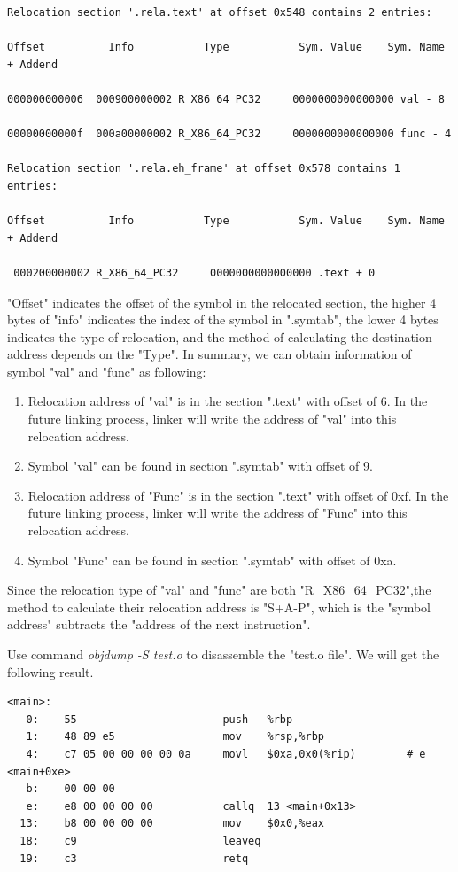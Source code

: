         \begin{lstlisting}[caption=Relocation section of "test.o"]
Relocation section '.rela.text' at offset 0x548 contains 2 entries: 

Offset          Info           Type           Sym. Value    Sym. Name + Addend 

000000000006  000900000002 R_X86_64_PC32     0000000000000000 val - 8 

00000000000f  000a00000002 R_X86_64_PC32     0000000000000000 func - 4 

Relocation section '.rela.eh_frame' at offset 0x578 contains 1 entries: 

Offset          Info           Type           Sym. Value    Sym. Name + Addend 

 000200000002 R_X86_64_PC32     0000000000000000 .text + 0            \end{lstlisting}
            
         
    "Offset" indicates the offset of the symbol in the relocated section, the higher 4 bytes of "info" indicates the index of the symbol in ".symtab", the lower 4 bytes indicates the type of relocation, and the method of calculating the destination address depends on the "Type".
    In summary, we can obtain information of symbol "val" and "func" as following:
    \begin{enumerate}
        \item Relocation address of "val" is in the section ".text" with offset of 6. In the future linking process, linker will write the address of "val" into this relocation address.
        \item Symbol "val" can be found in section ".symtab" with offset of 9.
        \item  Relocation address of "Func" is in the section ".text" with offset of 0xf. In the future linking process, linker will write the address of "Func" into this relocation address.
        \item Symbol "Func" can be found in section ".symtab" with offset of 0xa.
    \end{enumerate}
   
     Since the relocation type of "val" and "func" are both "R\_X86\_64\_PC32",the method to calculate their relocation address is "S+A-P", which is the "symbol address" subtracts the "address of the next instruction"\cite{TIS-95}.\newline
     
     Use command \textit{objdump -S test.o} to disassemble the "test.o file". We will get the following result.
     \begin{lstlisting}[caption=Disassembly of section .text: ]
<main>: 
   0:    55                       push   %rbp 
   1:    48 89 e5                 mov    %rsp,%rbp 
   4:    c7 05 00 00 00 00 0a     movl   $0xa,0x0(%rip)        # e <main+0xe> 
   b:    00 00 00 
   e:    e8 00 00 00 00           callq  13 <main+0x13> 
  13:    b8 00 00 00 00           mov    $0x0,%eax 
  18:    c9                       leaveq 
  19:    c3                       retq
     \end{lstlisting}
     
